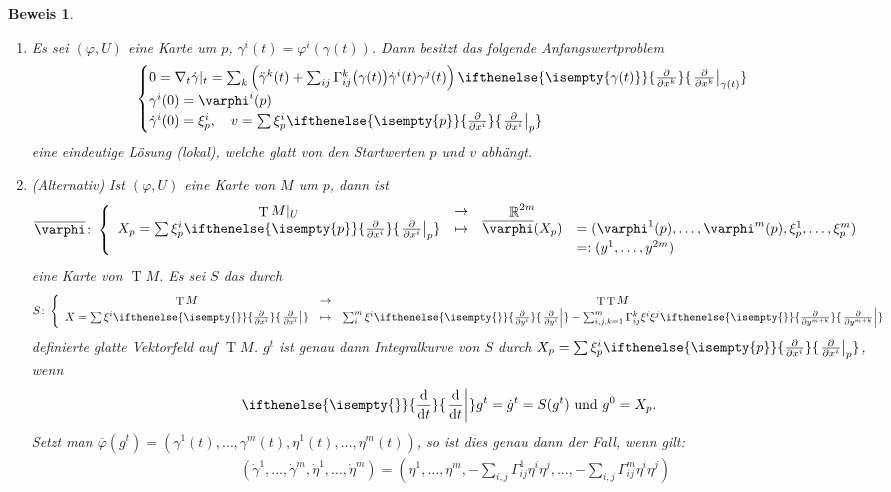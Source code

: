 \documentclass[paper=A4, twoside, chapterprefix=true, bibliography=totoc, headsepline]{scrbook}
\let\temp\phi{}
\let\phi\varphi{}
\let\varphi\temp{}
\let\temp\theta{}
\let\theta\vartheta{}
\let\vartheta\temp{}
\let\temp\epsilon{}
\let\epsilon\varepsilon{}
\let\varepsilon\temp{}
\let\temp\rho{}
\let\rho\varrho{}
\let\varrho\temp{}
\DeclareMathOperator{\R}{\mathbb{R}}
\DeclareMathOperator{\T}{T}         %
\newcommand{\dop}{\mathrm{d}}
\newcommand{\difffrac}[3][]{\ifthenelse{\isempty{#1}}{\frac{\dop #2}{\dop #3}}{\left. \frac{\dop #2}{\dop #3} \right|_{#1}}}
\newcommand{\pdifffrac}[3][]{\ifthenelse{\isempty{#1}}{\frac{\partial #2}{\partial #3}}{\left. \frac{\partial #2}{\partial #3} \right|_{#1}}}
\theoremstyle{plain}
\theoremstyle{nonumberplain}
\newtheorem{bew}{Beweis}
\theoremstyle{empty}
\theoremstyle{break}
\begin{document}
\begin{bew}
  \begin{enumerate}[label=(\Alph*),leftmargin=*,widest=B]
  \item Es sei $(\phi, U)$ eine Karte um $p$, $\gamma^i(t) = \phi^i(\gamma(t))$. Dann besitzt das folgende Anfangswertproblem
    \begin{align*}
      \begin{cases}
        0 = \nabla_t\dot \gamma|_t = \sum_k\left(\ddot \gamma^k(t) + \sum_{ij}\Gamma_{ij}^k\big(\gamma(t)\big)\dot \gamma^i(t)\gamma^j(t)\right) \pdifffrac[\gamma(t)]{}{x^k}\\
        \gamma^i(0) = \phi^i(p)\\
        \dot\gamma^i(0) = \xi_p^i, \quad v = \sum \xi^i_p\pdifffrac[p]{}{x^i}
      \end{cases}
    \end{align*}
    eine eindeutige L\"osung (lokal), welche glatt von den Startwerten $p$ und $v$ abh\"angt.
  \item (Alternativ) Ist $(\phi, U)$ eine Karte von $M$ um $p$, dann ist
    \[ \overline \phi \colon \left\{\begin{array}{cccl}
        \T M|_U &\to& \R^{2m}&\\
        X_p=\sum \xi_p^i\pdifffrac[p]{}{x^i} &\mapsto& \overline\phi(X_p) &= (\phi^1(p), \ldots, \phi^m(p), \xi_p^1, \ldots, \xi_p^m)\\
        &&& =: (y^1, \ldots, y^{2m})
      \end{array}\right.\]
    eine Karte von $\T M$.	
    Es sei $S$ das durch
    \[ S \colon \left\{ \begin{array}{ccc}
        \T M &\to& \T\T M\\
        X = \sum \xi^i \pdifffrac{}{x^i} &\mapsto& \sum_i^m \xi^i \pdifffrac{}{y^i} - \sum_{i,j,k=1}^{m} \Gamma_{ij}^k \xi^i\xi^j\pdifffrac{}{y^{m+k}}
      \end{array}\right.\]
    definierte glatte Vektorfeld auf $\T M$.	
    $g^t$ ist genau dann Integralkurve von $S$ durch $X_p = \sum \xi_p^i\pdifffrac[p]{}{x^i}$, wenn
    \begin{align*}
      \difffrac{}{t}g^t = \dot g^t = S(g^t) \text{ und } g^0 = X_p.
    \end{align*}
    Setzt man $\overline \phi(g^t) = (\gamma^1(t), \ldots, \gamma^m(t),\eta^1(t), \ldots, \eta^m(t))$, so ist dies genau dann der Fall, wenn gilt:
    \begin{align*}
      & (\dot\gamma^1,\ldots, \dot\gamma^m,\dot\eta^1,\ldots, \dot\eta^m) = \left(\eta^1, \ldots, \eta^m, -\sum_{i,j}\Gamma_{ij}^1\eta^i\eta^j, \ldots, -\sum_{i,j}\Gamma_{ij}^m\eta^i\eta^j\right)\\

\end{align*}
\end{enumerate}
\end{bew}
\end{document}
